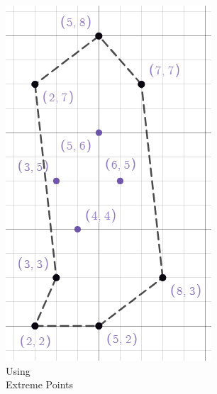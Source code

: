 \documentclass[a4paper,12pt]{article}
\begin{document}
  \begin{figure}[h!]
    \centering
    \begin{subfigure}[b]{0.2\linewidth}
      \includegraphics[width=\linewidth]{cg_lab_4_output_extreme_points.png}
      \caption{Using \\Extreme Points}
    \end{subfigure}
    \hspace{1in}
    \begin{subfigure}[b]{0.2\linewidth}

\end{subfigure}
\end{figure}
\end{document}
